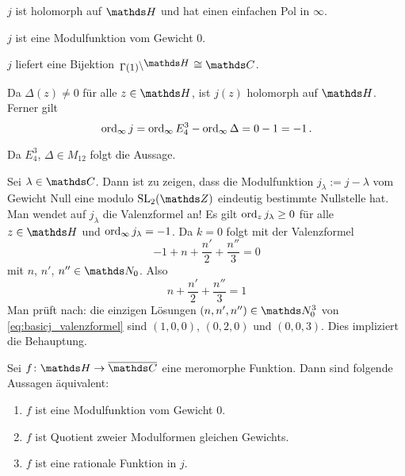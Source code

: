 \begin{satz-list}\label{satz:j_eigenschaften}
	\item $j$ ist holomorph auf $\HH$ und hat einen einfachen Pol in $\infty$.
	\item $j$ ist eine Modulfunktion vom Gewicht $0$.
	\item $j$ liefert eine Bijektion $\linksmodulo{\Gamma(1)}{\HH} \cong \CC$.
\end{satz-list}

\begin{bewe-list}
	\item  Da $\Delta(z) \not= 0$ für alle $z\in\HH$, ist $j(z)$ holomorph auf $\HH$.
	Ferner gilt
	\[
		\operatorname{ord}_\infty j = \operatorname{ord}_\infty E_4^3 - \operatorname{ord}_\infty \Delta = 0 - 1 = -1
		\,.
	\]
	\item Da $E_4^3$, $\Delta \in M_{12}$ folgt die Aussage.
	\item Sei $\lambda \in \CC$. Dann ist zu zeigen, dass die Modulfunktion $j_\lambda := j - \lambda$ vom Gewicht Null eine modulo $\SL_2(\ZZ)$ eindeutig bestimmte Nullstelle hat.
	Man wendet auf $j_\lambda$ die Valenzformel an!
	Es gilt $\operatorname{ord}_z j_\lambda \geq 0$ für alle $z\in\HH$ und $\operatorname{ord}_\infty j_\lambda = -1$.
	Da $k = 0$ folgt mit der Valenzformel
	\[
		-1 + n + \frac{n'}{2} + \frac{n''}{3} = 0
	\]
	mit $n$, $n'$, $n'' \in \NN_0$.
	Also
	\begin{equation}\label{eq:basicj_valenzformel}
		n + \frac{n'}{2} + \frac{n''}{3} = 1
	\end{equation}
	Man prüft nach: die einzigen Lösungen $(n,n',n'') \in \NN_0^3$ von \eqref{eq:basicj_valenzformel} sind $(1,0,0)$, $(0,2,0)$ und $(0,0,3)$.
	Dies impliziert die Behauptung.
\end{bewe-list}

\begin{satz}\label{satz:charakterisierung_modulfunktion_0}
	Sei $f\colon \HH \to \closure{\CC}$ eine meromorphe Funktion. Dann sind folgende Aussagen äquivalent:
	\begin{enumerate}
		\item $f$ ist eine Modulfunktion vom Gewicht 0.
		\item $f$ ist Quotient zweier Modulformen gleichen Gewichts.
		\item $f$ ist eine rationale Funktion in $j$.
	\end{enumerate}
\end{satz}

